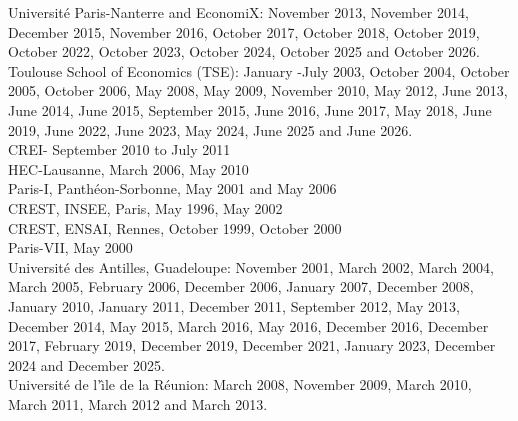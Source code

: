 \noindent Universit\'e Paris-Nanterre and EconomiX: November 2013, November 2014, December 2015, November 2016, October 2017, October 2018,  October 2019,  October 2022,  October 2023, October 2024, October 2025 and October 2026.
\vspace{.2cm}\\
\noindent Toulouse School of Economics (TSE): January -July 2003, October 2004, October 2005, October 2006,
May 2008, May 2009, November 2010, May 2012, June 2013, June 2014, June
2015, September 2015, June 2016, June 2017, May 2018, June 2019, June 2022, June 2023, May 2024, June 2025 and June 2026.
\vspace{.2cm}\\
\noindent CREI- September 2010 to July 2011
\vspace{.2cm}\\
\noindent HEC-Lausanne, March 2006, May 2010
\vspace{.2cm}\\
\noindent Paris-I, Panth\'eon-Sorbonne, May 2001 and May 2006
\vspace{.2cm}\\
\noindent CREST, INSEE, Paris, May 1996, May 2002
\vspace{.2cm}\\
\noindent CREST, ENSAI, Rennes, October 1999, October 2000
\vspace{.2cm}\\
\noindent Paris-VII, May 2000
\vspace{.2cm}\\
\noindent Universit\'e des Antilles, Guadeloupe: November 2001, March
2002, March 2004, March 2005, February 2006, December 2006, January 2007,
December 2008, January 2010, January 2011, December 2011, September 2012,
May 2013, December 2014, May 2015, March 2016, May 2016, December 2016, December 2017, February 2019, December 2019, December 2021, January 2023, December 2024 and December 2025.
\vspace{.2cm}\\
\noindent Universit\'e de l'\^{\i}le de la R\'eunion: March 2008, November 2009, March 2010, March 2011, March 2012 and March 2013. 

